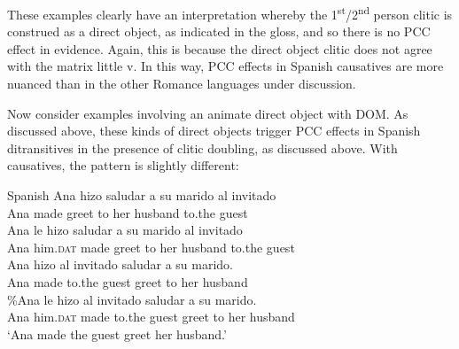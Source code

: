 \documentclass[output=paper,colorlinks,citecolor=brown,nonflat]{./langscibook}
\begin{document}
These examples clearly have an interpretation whereby the 1\textsuperscript{st}/2\textsuperscript{nd} person clitic is construed as a direct object, as indicated in the gloss, and so there is no PCC effect in evidence. Again, this is because the direct object clitic does not agree with the matrix little v. In this way, PCC effects in Spanish causatives are more nuanced than in the other Romance languages under discussion. 

Now consider examples involving an animate direct object with DOM. As discussed above, these kinds of direct objects trigger PCC effects in Spanish ditransitives in the presence of clitic doubling, as discussed above. With causatives, the pattern is slightly different:

\ea%
    \label{ex:sheehan:35}
    Spanish
    \ea\label{ex:sheehan:35a}
    \gll    *Ana   hizo   saludar   a   su   marido   al    invitado\\
            Ana   made   greet   to   her   husband  to.the   guest\\
    \ex\label{ex:sheehan:35b}
    \gll    *Ana   le   hizo   saludar   a   su   marido   al   invitado\\
            Ana   him.\textsc{dat}   made   greet   to   her husband to.the   guest\\
    \ex\label{ex:sheehan:35c}
    \gll    Ana   hizo     al     invitado   saludar   a   su   marido.\\
            Ana   made   to.the   guest   greet   to   her   husband\\
    \ex\label{ex:sheehan:35d}
    \gll    \%Ana le   hizo   al   invitado saludar   a     su   marido.\\
            Ana   him.\textsc{dat}   made   to.the   guest   greet   to   her   husband\\
    \glt    ‘Ana made the guest greet her husband.’
    \z
\z
\end{document}
